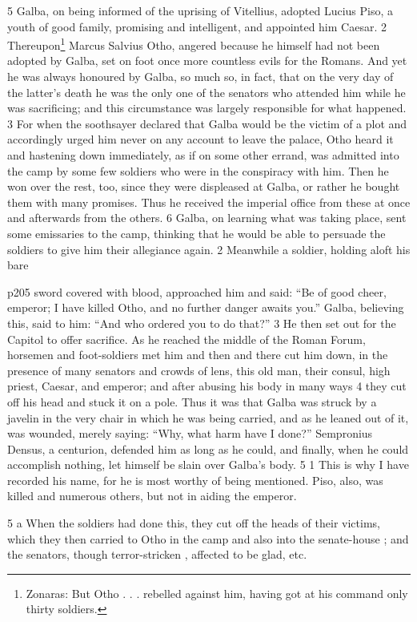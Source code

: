 5 Galba, on being informed of the uprising of Vitellius, adopted Lucius Piso, a youth of good family, promising and intelligent, and appointed him Caesar. 2 Thereupon\texthebrew{⁠}\footnote{Zonaras: But Otho . . . rebelled against him, having got at his command only thirty soldiers.

} Marcus Salvius Otho, angered because he himself had not been adopted by Galba, set on foot once more countless evils for the Romans. And yet he was always honoured by Galba, so much so, in fact, that on the very day of the latter's death he was the only one of the senators who attended him while he was sacrifi­cing; and this circumstance was largely responsible for what happened. 3 For when the soothsayer declared that Galba would be the victim of a plot and accordingly urged him never on any account to leave the palace, Otho heard it and hastening down immediately, as if on some other errand, was admitted into the camp by some few soldiers who were in the conspiracy with him. Then he won over the rest, too, since they were displeased at Galba, or rather he bought them with many promises. Thus he received the imperial office from these at once and afterwards from the others. 6 Galba, on learning what was taking place, sent some emissaries to the camp, thinking that he would be able to persuade the soldiers to give him their allegiance again. 2 Meanwhile a soldier, holding aloft his bare

p205 sword covered with blood, approached him and said: ``Be of good cheer, emperor; I have killed Otho, and no further danger awaits you.'' Galba, believing this, said to him: ``And who ordered you to do that?'' 3 He then set out for the Capitol to offer sacrifice. As he reached the middle of the Roman Forum, horsemen and foot-soldiers met him and then and there cut him down, in the presence of many senators and crowds of lens, this old man, their consul, high priest, Caesar, and emperor; and after abusing his body in many ways 4 they cut off his head and stuck it on a pole. Thus it was that Galba was struck by a javelin in the very chair in which he was being carried, and as he leaned out of it, was wounded, merely saying: ``Why, what harm have I done?'' Sempronius Densus, a centurion, defended him as long as he could, and finally, when he could accomplish nothing, let himself be slain over Galba's body. 5 1 This is why I have recorded his name, for he is most worthy of being mentioned. Piso, also, was killed and numerous others, but not in aiding the emperor.

5 a When the soldiers had done this, they cut off the heads of their victims, which they then carried to Otho in the camp and also into the senate-house ; and the senators, though terror-stricken , affected to be glad, etc.

